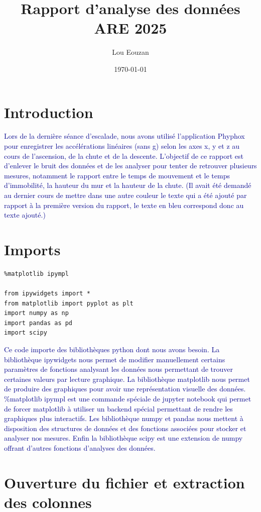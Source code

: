 \documentclass[11pt]{article}
\author{Lou Eouzan}
\date{\today}
\title{Rapport d'analyse des données ARE 2025}
\begin{document}
\maketitle
\tableofcontents

\section{Introduction}
\label{sec:org0639026}

\textcolor{darkblue}{Lors de la dernière séance d'escalade, nous avons utilisé l'application Phyphox pour enregistrer les accélérations linéaires (sans g) selon les axes x, y et z au cours de l'ascension, de la chute et de la descente. L'objectif de ce rapport est d'enlever le bruit des données et de les analyser pour tenter de retrouver plusieurs mesures, notamment le rapport entre le temps de mouvement et le temps d'immobilité, la hauteur du mur et la hauteur de la chute. (Il avait été demandé au dernier cours de mettre dans une autre couleur le texte qui a été ajouté par rapport à la première version du rapport, le texte en bleu correspond donc au texte ajouté.)}
\section{Imports}
\label{sec:orga114243}

\begin{verbatim}
%matplotlib ipympl

from ipywidgets import *
from matplotlib import pyplot as plt
import numpy as np
import pandas as pd
import scipy
\end{verbatim}

\textcolor{darkblue}{Ce code importe des bibliothèques python dont nous avons besoin. La bibliothèque ipywidgets nous permet de modifier manuellement certains paramètres de fonctions analysant les données nous permettant de trouver certaines valeurs par lecture graphique. La bibliothèque matplotlib nous permet de produire des graphiques pour avoir une représentation visuelle des données. \%matplotlib ipympl est une commande spéciale de jupyter notebook qui permet de forcer matplotlib à utiliser un backend spécial permettant de rendre les graphiques plus interactifs. Les bibliothèque numpy et pandas nous mettent à disposition des structures de données et des fonctions associées pour stocker et analyser nos mesures. Enfin la bibliothèque scipy est une extension de numpy offrant d'autres fonctions d'analyses des données.}
\section{Ouverture du fichier et extraction des colonnes}
\label{sec:org2b2cf02}
\end{document}
